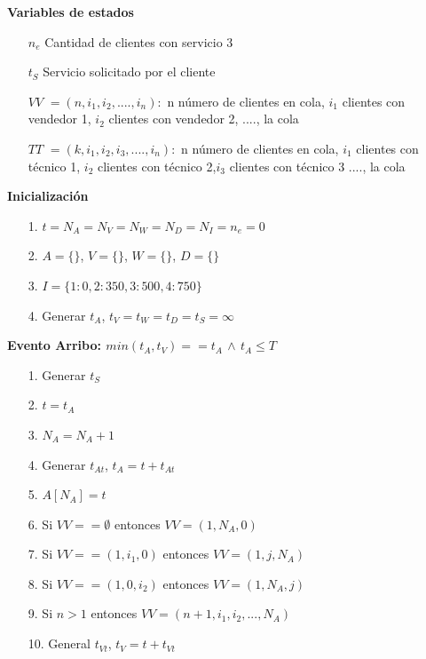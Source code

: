 \documentclass[12pt]{article}
\begin{document}
\noindent \textbf{Variables de estados}
\begin{itemize}
        \item[$n_e$] Cantidad de clientes con servicio 3
        \item[$t_S$] Servicio solicitado por el cliente
        \item[$VV$]   $=(n, i_1, i_2, ...., i_n):$ n n\'umero de clientes en cola, $i_1$ clientes con vendedor 1, $i_2$ clientes con vendedor 2, ...., la cola
        \item[$TT$]  $= (k, i_1, i_2, i_3, ...., i_n):$ n n\'umero de clientes en cola, $i_1$ clientes con t\'ecnico 1, $i_2$ clientes con t\'ecnico 2,$i_3$ clientes con t\'ecnico 3 ...., la cola
\end{itemize}

\noindent \textbf{Inicializaci\'on}
\begin{itemize}
        \item[1.] $t=N_A=N_V=N_W=N_D=N_I=n_e=0$
        \item[2.] $A=\{\}$, $V=\{\}$, $W=\{\}$, $D=\{\}$
        \item[3.] $I = \{1:0, 2:350, 3:500, 4:750\}$
        \item[4.] Generar $t_A$, $t_V=t_W=t_D=t_S=\infty$
\end{itemize}

\noindent \textbf{Evento Arribo: $min(t_A, t_V) == t_A$ $\wedge$ $t_A \leq T$}
\begin{itemize}
        \item[1.] Generar $t_{S}$
        \item[2.] $t = t_A$
        \item[3.] $N_A = N_A + 1$       
        \item[4.] Generar $t_{At}$, $t_A = t + t_{At}$
        \item[5.] $A[N_A] = t$
        \item[6.] Si $VV == \emptyset$ entonces $VV = (1, N_A, 0)$
        \item[7.] Si $VV == (1, i_1, 0)$ entonces $VV = (1, j, N_A)$
        \item[8.] Si $VV == (1, 0, i_2)$ entonces $VV = (1, N_A, j)$
        \item[9.] Si $n > 1$ entonces $VV = (n+1, i_1, i_2,...,N_A)$
        \item[10.] General $t_{Vt}$, $t_V = t + t_{Vt}$
\end{itemize}
\end{document}
